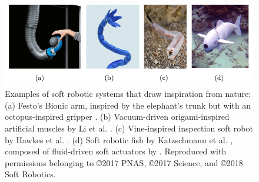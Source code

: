 \begin{figure}[!t]
    \vspace{-2mm}
    \includegraphics*[width=\textwidth]{./pdf/thesis-figurex-0-0-1.pdf}
    \vspace{-6mm}
    \caption{\small Examples of soft robotic systems that draw inspiration from nature: (a) Festo's Bionic arm, inspired by the elephant's trunk but with an octopus-inspired gripper \cite{Grzesiak2011}. (b) Vacuum-driven origami-inspired artificial muscles by Li et al. \cite{Li2017Dec}. (c) Vine-inspired inspection soft robot by Hawkes et al. \cite{Hawkes2017}. (d) Soft robotic fish by Katzschmann et al. \cite{Katzschmann2018}, composed of fluid-driven soft actuators by \cite{Marchese2014}. Reproduced with permissions belonging to \copyright2017 PNAS, \copyright2017 Science, and \copyright2018 Soft Robotics.
    \label{fig:C0:softrobotexamples}}
    \vspace{-4mm}
  \end{figure}

